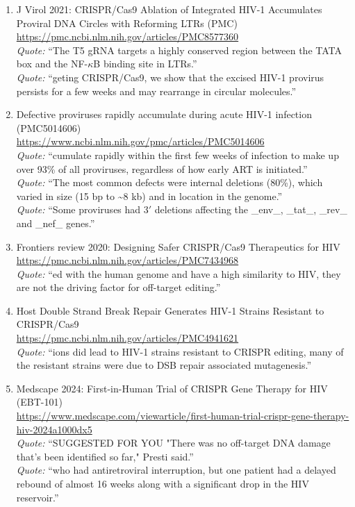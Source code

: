 \begin{enumerate}
\item [13] J Virol 2021: CRISPR/Cas9 Ablation of Integrated HIV-1 Accumulates Proviral DNA Circles with Reforming LTRs (PMC) \\ \url{https://pmc.ncbi.nlm.nih.gov/articles/PMC8577360}
  \\ {\sloppy \emph{Quote:} ``The T5 gRNA targets a highly conserved region between the TATA box and the NF-$\kappa$B binding site in LTRs.''}
  \\ {\sloppy \emph{Quote:} ``geting CRISPR/Cas9, we show that the excised HIV-1 provirus persists for a few weeks and may rearrange in circular molecules.''}

\item [15] Defective proviruses rapidly accumulate during acute HIV-1 infection (PMC5014606) \\ \url{https://www.ncbi.nlm.nih.gov/pmc/articles/PMC5014606}
  \\ {\sloppy \emph{Quote:} ``cumulate rapidly within the first few weeks of infection to make up over 93\% of all proviruses, regardless of how early ART is initiated.''}
  \\ {\sloppy \emph{Quote:} ``The most common defects were internal deletions (80\%), which varied in size (15 bp to \textasciitilde{}8 kb) and in location in the genome.''}
  \\ {\sloppy \emph{Quote:} ``Some proviruses had 3$'$ deletions affecting the \_env\_, \_tat\_, \_rev\_ and \_nef\_ genes.''}

\item [27] Frontiers review 2020: Designing Safer CRISPR/Cas9 Therapeutics for HIV \\ \url{https://pmc.ncbi.nlm.nih.gov/articles/PMC7434968}
  \\ {\sloppy \emph{Quote:} ``ed with the human genome and have a high similarity to HIV, they are not the driving factor for off-target editing.''}

\item [28] Host Double Strand Break Repair Generates HIV-1 Strains Resistant to CRISPR/Cas9 \\ \url{https://pmc.ncbi.nlm.nih.gov/articles/PMC4941621}
  \\ {\sloppy \emph{Quote:} ``ions did lead to HIV-1 strains resistant to CRISPR editing, many of the resistant strains were due to DSB repair associated mutagenesis.''}

\item [29] Medscape 2024: First-in-Human Trial of CRISPR Gene Therapy for HIV (EBT-101) \\ \url{https://www.medscape.com/viewarticle/first-human-trial-crispr-gene-therapy-hiv-2024a1000dx5}
  \\ {\sloppy \emph{Quote:} ``SUGGESTED FOR YOU "There was no off-target DNA damage that's been identified so far," Presti said.''}
  \\ {\sloppy \emph{Quote:} ``who had antiretroviral interruption, but one patient had a delayed rebound of almost 16 weeks along with a significant drop in the HIV reservoir.''}


\end{enumerate}
